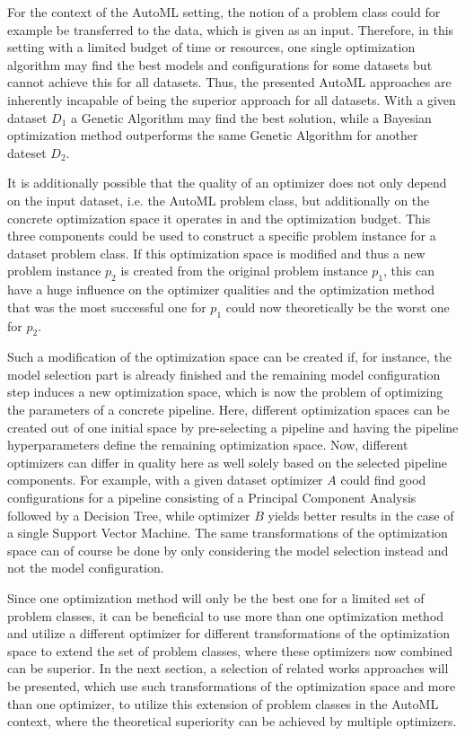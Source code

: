 For the context of the AutoML setting, the notion of a problem class could for example be transferred to the data, which is given as an input.
Therefore, in this setting with a limited budget of time or resources, one single optimization algorithm may find the best models and configurations for some datasets but cannot achieve this for all datasets.
Thus, the presented AutoML approaches are inherently incapable of being the superior approach for all datasets.
With a given dataset $D_1$ a Genetic Algorithm may find the best solution, while a Bayesian optimization method outperforms the same Genetic Algorithm for another dateset $D_2$.

It is additionally possible that the quality of an optimizer does not only depend on the input dataset, i.e. the AutoML problem class, but additionally on the concrete optimization space it operates in and the optimization budget.
This three components could be used to construct a specific problem instance for a dataset problem class.\newline
If this optimization space is modified and thus a new problem instance $p_2$ is created from the original problem instance $p_1$, this can have a huge influence on the optimizer qualities and the optimization method that was the most successful one for $p_1$ could now theoretically be the worst one for $p_2$.

Such a modification of the optimization space can be created if, for instance, the model selection part is already finished and the remaining model configuration step induces a new optimization space, which is now the problem of optimizing the parameters of a concrete pipeline.
Here, different optimization spaces can be created out of one initial space by pre-selecting a pipeline and having the pipeline hyperparameters define the remaining optimization space.\newline
Now, different optimizers can differ in quality here as well solely based on the selected pipeline components.
For example, with a given dataset optimizer $A$ could find good configurations for a pipeline consisting of a Principal Component Analysis followed by a Decision Tree, while optimizer $B$ yields better results in the case of a single Support Vector Machine.
The same transformations of the optimization space can of course be done by only considering the model selection instead and not the model configuration.

Since one optimization method will only be the best one for a limited set of problem classes, it can be beneficial to use more than one optimization method and utilize a different optimizer for different transformations of the optimization space to extend the set of problem classes, where these optimizers now combined can be superior.\newline
In the next section, a selection of related works approaches will be presented, which use such transformations of the optimization space and more than one optimizer, to utilize this extension of problem classes in the AutoML context, where the theoretical superiority can be achieved by multiple optimizers.

